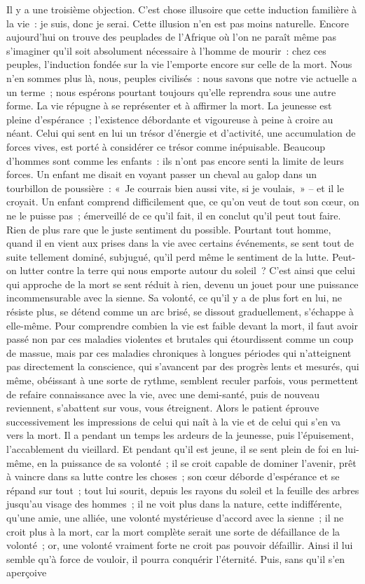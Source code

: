 \documentclass[french,twoside]{book} %
\begin{document}
Il y a une troisième objection. C’est chose illusoire que cette induction familière à la vie : je suis, donc je serai. Cette illusion n’en est pas moins naturelle. Encore aujourd’hui on trouve des peuplades de l’Afrique où l’on ne paraît même pas s’imaginer qu’il soit absolument nécessaire à l’homme de mourir : chez ces peuples, l’induction fondée sur la vie l’emporte encore sur celle de la mort. Nous n’en sommes plus là, nous, peuples civilisés : nous savons que notre vie actuelle a un terme ; nous espérons pourtant toujours qu’elle reprendra sous une autre forme. La vie répugne à se représenter et à affirmer la mort. La jeunesse est pleine d’espérance ; l’existence débordante et vigoureuse à peine à croire au néant. Celui qui sent en lui un trésor d’énergie et d’activité, une accumulation de forces vives, est porté à considérer ce trésor comme inépuisable. Beaucoup d’hommes sont comme les enfants : ils n’ont pas encore senti la limite de leurs forces. Un enfant me disait en voyant passer un cheval au galop dans un tourbillon de poussière : « Je courrais bien aussi vite, si je voulais, » – et il le croyait. Un enfant comprend difficilement que, ce qu’on veut de tout son cœur, on ne le puisse pas ; émerveillé de ce qu’il fait, il en conclut qu’il peut tout faire. Rien de plus rare que le juste sentiment du possible. Pourtant tout homme, quand il en vient aux prises dans la vie avec certains événements, se sent tout de suite tellement dominé, subjugué, qu’il perd même le sentiment de la lutte. Peut-on lutter contre la terre qui nous emporte autour du soleil ? C’est ainsi que celui qui approche de la mort se sent réduit à rien, devenu un jouet pour une puissance incommensurable avec la sienne. Sa volonté, ce qu’il y a de plus fort en lui, ne résiste plus, se détend comme un arc brisé, se dissout graduellement, s’échappe à elle-même. Pour comprendre combien la vie est faible devant la mort, il faut avoir passé non par ces maladies violentes et brutales qui étourdissent comme un coup de massue, mais par ces maladies chroniques à longues périodes qui n’atteignent pas directement la conscience, qui s’avancent par des progrès lents et mesurés, qui même, obéissant à une sorte de rythme, semblent reculer parfois, vous permettent de refaire connaissance avec la vie, avec une demi-santé, puis de nouveau reviennent, s’abattent sur vous, vous étreignent. Alors le patient éprouve successivement les impressions de celui qui naît à la vie et de celui qui s’en va vers la mort. Il a pendant un temps les ardeurs de la jeunesse, puis l’épuisement, l’accablement du vieillard. Et pendant qu’il est jeune, il se sent plein de foi en lui-même, en la puissance de sa volonté ; il se croit capable de dominer l’avenir, prêt à vaincre dans sa lutte contre les choses ; son cœur déborde d’espérance et se répand sur tout ; tout lui sourit, depuis les rayons du soleil et la feuille des arbres jusqu’au visage des hommes ; il ne voit plus dans la nature, cette indifférente, qu’une amie, une alliée, une volonté mystérieuse d’accord avec la sienne ; il ne croit plus à la mort, car la mort complète serait une sorte de défaillance de la volonté ; or, une volonté vraiment forte ne croit pas pouvoir défaillir. Ainsi il lui semble qu’à force de vouloir, il pourra conquérir l’éternité. Puis, sans qu’il s’en aperçoive 
\end{document}
